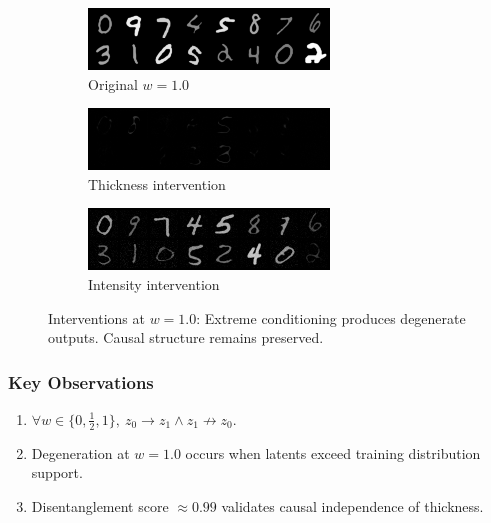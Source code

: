 \documentclass{article}
\begin{document}
	\begin{figure}[H]
		\centering
		\begin{subfigure}{0.32\textwidth}
			\centering
			\includegraphics[width=\textwidth]{images/original_1.0}
			\caption{Original $w=1.0$}
		\end{subfigure}
		\begin{subfigure}{0.32\textwidth}
			\centering
			\includegraphics[width=\textwidth]{images/thickness_1.0}
			\caption{Thickness intervention}
		\end{subfigure}
		\begin{subfigure}{0.32\textwidth}
			\centering
			\includegraphics[width=\textwidth]{images/intensity_1.0}
			\caption{Intensity intervention}
		\end{subfigure}
		\caption{Interventions at $w=1.0$: Extreme conditioning produces degenerate outputs. Causal structure remains preserved.}
		\label{fig:w1}
	\end{figure}
	
	\subsubsection*{Key Observations}
	\begin{enumerate}
		\item $\forall w \in \{0, \frac{1}{2}, 1\}, \ z_0 \rightarrow z_1 \land z_1 \not \rightarrow z_0$.
		\item Degeneration at $w = 1.0$ occurs when latents exceed training distribution support.
		\item Disentanglement score $\approx 0.99$ validates causal independence of thickness.
	\end{enumerate}
	
\end{document}
